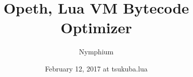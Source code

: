 \documentclass[aspectratio=169,unicode,compress,14pt]{beamer}
\title{\Opeth}
\author{\footnotesize{}Nymphium}
\date{\footnotesize{}February 12, 2017 at tsukuba.lua}
\def\aatitle{Opeth, Lua VM Bytecode Optimizer}
\begin{document}
\bgroup
\theking
\maketitle
\egroup
\title{\aatitle}
\skipnexttoc





\end{document}
